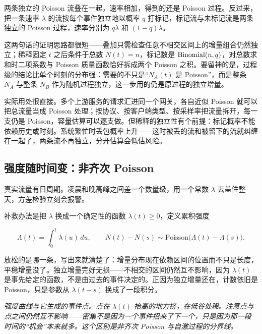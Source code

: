 两条独立的 Poisson 流叠在一起，速率相加，得到的还是 Poisson 过程。反过来，把一条速率 \(\lambda\) 的流按每个事件独立地以概率 \(q\) 打标记，标记流与未标记流是两条独立的 Poisson 过程，速率分别为 \(q\lambda\) 和 \((1-q)\lambda\)。

这两句话的证明思路都很短——叠加只需检查任意不相交区间上的增量组合仍然独立；稀释固定 \(t\) 之后条件于总数 \(N(t)=n\)，标记数是 \(\operatorname{Binomial}(n,q)\)，对总数求和时二项系数与 Poisson 质量函数恰好拆成两个 Poisson 之积。要留神的是，过程级的结论比单个时刻的分布强：需要的不只是``\(N_A(t)\) 是 Poisson''，而是整条 \(N_A\) 与整条 \(N_B\) 作为随机过程独立，这一步用的仍是原过程的独立增量。

实际用处很直接。多个上游服务的请求汇进同一个网关，各自近似 Poisson 就可以把总流量当成 Poisson 处理；按协议、按客户端类型、按采样率把流量拆开，每一支仍是 Poisson，容量估算可以逐支做。但稀释的独立性有个前提：标记概率不能依赖历史或时刻。系统繁忙时丢包概率上升——这时被丢的流和被留下的流就纠缠在一起了，两条流不再独立，分开估算会低估风险。

\subsection{强度随时间变：非齐次 Poisson}

真实流量有日周期。凌晨和晚高峰之间差一个数量级，用一个常数 \(\lambda\) 去盖住整天，方差检验立刻会报警。

补救办法是把 \(\lambda\) 换成一个确定性的函数 \(\lambda(t)\ge0\)，定义累积强度

\[
\Lambda(t)=\int_0^t\lambda(u)\,du,
\qquad
N(t)-N(s)\sim\mathrm{Poisson}\bigl(\Lambda(t)-\Lambda(s)\bigr).
\]

放松的是哪一条，写出来就清楚了：增量分布现在依赖区间的位置而不只是长度，平稳增量没了。独立增量完好无损——不相交的区间仍然互不影响，因为 \(\lambda(t)\) 是事先给定的函数，不是由过去的事件决定的。正因为独立增量还在，计数依旧是 Poisson，只是参数从 \(\lambda(t-s)\) 换成了一段积分。

\begin{center}

\emph{强度曲线与它生成的事件点。点在 \(\lambda(t)\) 抬高的地方挤，在低谷处稀。注意点与点之间仍然互不影响——密集不是因为一个事件招来了下一个，只是因为那一段时间的``机会''本来就多。这个区别是非齐次 Poisson 与自激过程的分界线。}
\end{center}

